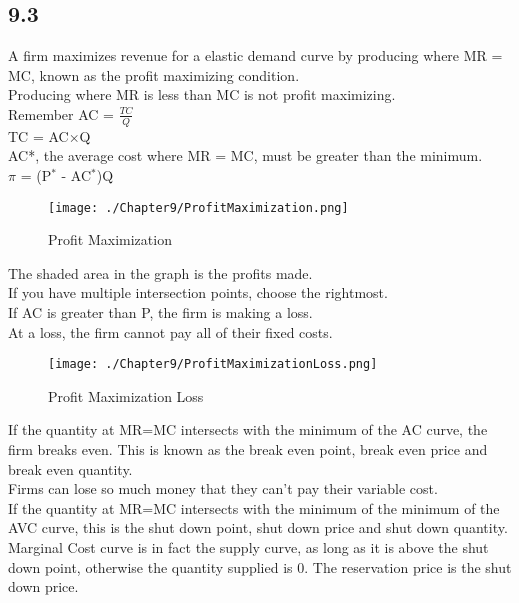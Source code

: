 \subsection*{9.3}
A firm maximizes revenue for a elastic demand curve by producing where MR = MC, known as the profit maximizing condition.\\
Producing where MR is less than MC is not profit maximizing.\\
Remember AC = $\frac{TC}{Q}$\\
TC = AC$\times$Q\\
AC*, the average cost where MR = MC, must be greater than the minimum.\\
$\pi$ = (P$^*$ - AC$^*$)Q
\begin{figure}[H]
    \centering
    \texttt{[image: ./Chapter9/ProfitMaximization.png]}
    \caption{Profit Maximization}
\end{figure}
The shaded area in the graph is the profits made.\\
If you have multiple intersection points, choose the rightmost.\\
If AC is greater than P, the firm is making a loss.\\
At a loss, the firm cannot pay all of their fixed costs.
\begin{figure}[H]
    \centering
    \texttt{[image: ./Chapter9/ProfitMaximizationLoss.png]}
    \caption{Profit Maximization Loss}
\end{figure}
If the quantity at MR=MC intersects with the minimum of the AC curve, the firm breaks even.
This is known as the break even point, break even price and break even quantity.\\
Firms can lose so much money that they can't pay their variable cost.\\
If the quantity at MR=MC intersects with the minimum of the minimum of the AVC curve, this is the shut down point, shut down price and shut down quantity.\\
Marginal Cost curve is in fact the supply curve, as long as it is above the shut down point, otherwise the quantity supplied is 0. The reservation price is the shut down price.
